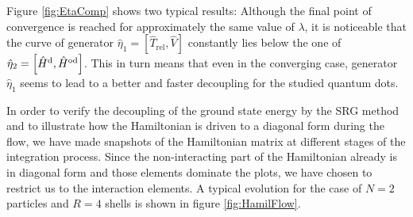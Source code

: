 Figure \ref{fig:EtaComp} shows two typical results: Although the final point of convergence is reached for approximately the same value of $\lambda$, it is noticeable that the curve of generator $\hat{\eta}_1 = \left[ \hat{T}_{\text{rel}}, \hat{V}\right]$ constantly lies below the one of  $\hat{\eta}_2 = \left[ \hat{H}^{\rm d}, \hat{H}^{\rm od} \right]$. This in turn means that even in the converging case, generator $\hat{\eta}_1$ seems  to lead to a better and faster decoupling for the studied quantum dots.


In order to verify the decoupling of the ground state energy by the SRG method and to illustrate how the Hamiltonian is driven to a diagonal form during the flow, we have made snapshots of the Hamiltonian matrix at different stages of the integration process. Since the non-interacting part of the Hamiltonian already is in diagonal form and those elements dominate the plots, we have chosen to restrict us to the interaction elements. A typical evolution for the case of $N=2$ particles and $R = 4$ shells is shown in figure \ref{fig:HamilFlow}.

